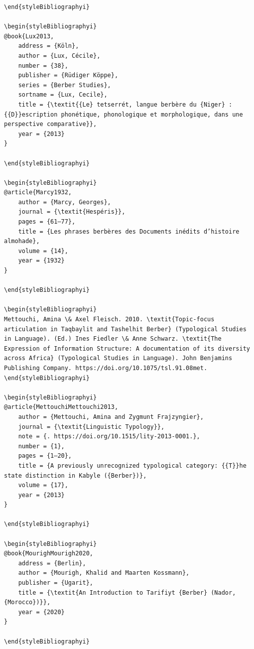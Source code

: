 \documentclass[output=paper]{langscibook}
\begin{document}
\begin{verbatim}
\end{styleBibliographyi}

\begin{styleBibliographyi}
@book{Lux2013,
	address = {Köln},
	author = {Lux, Cécile},
	number = {38},
	publisher = {Rüdiger Köppe},
	series = {Berber Studies},
	sortname = {Lux, Cecile},
	title = {\textit{{Le} tetserrét, langue berbère du {Niger} : {{D}}escription phonétique, phonologique et morphologique, dans une perspective comparative}},
	year = {2013}
}

\end{styleBibliographyi}

\begin{styleBibliographyi}
@article{Marcy1932,
	author = {Marcy, Georges},
	journal = {\textit{Hespéris}},
	pages = {61–77},
	title = {Les phrases berbères des Documents inédits d’histoire almohade},
	volume = {14},
	year = {1932}
}

\end{styleBibliographyi}

\begin{styleBibliographyi}
Mettouchi, Amina \& Axel Fleisch. 2010. \textit{Topic-focus articulation in Taqbaylit and Tashelhit Berber} (Typological Studies in Language). (Ed.) Ines Fiedler \& Anne Schwarz. \textit{The Expression of Information Structure: A documentation of its diversity across Africa} (Typological Studies in Language). John Benjamins Publishing Company. https://doi.org/10.1075/tsl.91.08met.
\end{styleBibliographyi}

\begin{styleBibliographyi}
@article{MettouchiMettouchi2013,
	author = {Mettouchi, Amina and Zygmunt Frajzyngier},
	journal = {\textit{Linguistic Typology}},
	note = {. https://doi.org/10.1515/lity-2013-0001.},
	number = {1},
	pages = {1–20},
	title = {A previously unrecognized typological category: {{T}}he state distinction in Kabyle ({Berber})},
	volume = {17},
	year = {2013}
}

\end{styleBibliographyi}

\begin{styleBibliographyi}
@book{MourighMourigh2020,
	address = {Berlin},
	author = {Mourigh, Khalid and Maarten Kossmann},
	publisher = {Ugarit},
	title = {\textit{An Introduction to Tarifiyt {Berber} (Nador, {Morocco})}},
	year = {2020}
}

\end{styleBibliographyi}


\end{verbatim}
\end{document}
